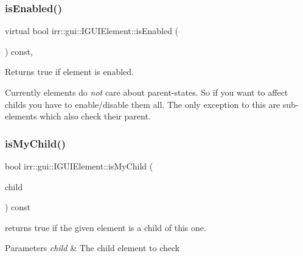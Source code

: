 \subsubsection{\texorpdfstring{is\+Enabled()}{isEnabled()}}
{\footnotesize\ttfamily virtual bool irr\+::gui\+::\+I\+G\+U\+I\+Element\+::is\+Enabled (\begin{DoxyParamCaption}{ }\end{DoxyParamCaption}) const\hspace{0.3cm}{\ttfamily [inline]}, {\ttfamily [virtual]}}



Returns true if element is enabled. 

Currently elements do {\itshape not} care about parent-\/states. So if you want to affect childs you have to enable/disable them all. The only exception to this are sub-\/elements which also check their parent. \mbox{\label{classirr_1_1gui_1_1IGUIElement_a72fe3668d62bfb7edc4586d582a947b4}} 
\subsubsection{\texorpdfstring{is\+My\+Child()}{isMyChild()}}
{\footnotesize\ttfamily bool irr\+::gui\+::\+I\+G\+U\+I\+Element\+::is\+My\+Child (\begin{DoxyParamCaption}\item[{\hyperlink{classirr_1_1gui_1_1IGUIElement}{I\+G\+U\+I\+Element} $\ast$}]{child }\end{DoxyParamCaption}) const\hspace{0.3cm}{\ttfamily [inline]}}



returns true if the given element is a child of this one. 


\begin{DoxyParams}{Parameters}
{\em child} & The child element to check \\
\hline
\end{DoxyParams}
\mbox{\label{classirr_1_1gui_1_1IGUIElement_a940fcf886f9ae1e4bc719e19057018a2}} 
